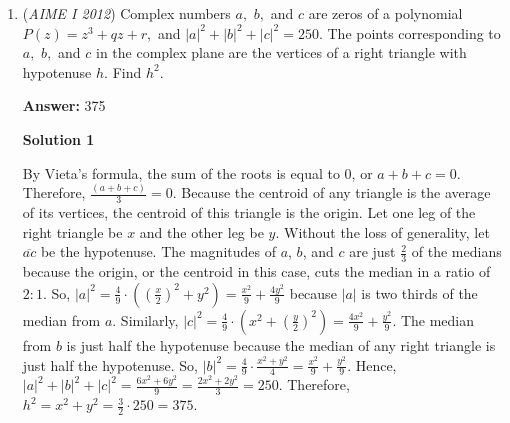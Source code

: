 \begin{enumerate}
 Summing, we have $[ADBECF] = 18 + \dfrac{25\sqrt{3}}{2}$

 Thus, $[ABC] = 9+\dfrac{25\sqrt{3}}{4}$, $9+25+3+4 = \boxed{41}$




\textbf{Solution 7 (faster than the fastest)}

Label the center of the circles $X$, and proceed with Solution 1 until out of the two possible equilateral triangles, you find the larger one.

 We note that the square of the side length $s$ of an equilateral triangle $ABC$ with the only information given being an arbitrary point $X$ inside $ABC$ such that $XA = a, XB = b, XB = c$ is given by the following formula:

 
 \[s^2 = \frac{1}{2}(a^2+b^2+c^2) + 2\sqrt{3}\delta,\]

 where $\delta$ equals the area of the triangle with side lengths $a,b,c.$ Since the $3,4,5$ triangle has area $6, \delta=6$ for us. Plugging in the other values $(XA = 5, XB = 4, XC = 3)$, we get

 
 \[s^2 = \frac{1}{2}(3^2+4^2+5^2) + 12\sqrt{3}.\]

 Multiplying this by $\frac{\sqrt{3}}{4},$ we attain the answer of 

 
 \[\frac{s^2\sqrt{3}}{4} = \frac{\sqrt{3}}{4}(25 + 12\sqrt{3}) = 9 + \frac{25\sqrt{3}}{4}, \Longrightarrow 9+25+3+4 = \boxed{041}.\]

 \href{https://artofproblemsolving.com/videos/amc/2012aimei/353}{https://artofproblemsolving.com/videos/amc/2012aimei/353}

 


	\item (\textit{AIME I 2012}) Complex numbers $a,$ $b,$ and $c$ are zeros of a polynomial $P(z) = z^3 + qz + r,$ and $|a|^2 + |b|^2 + |c|^2 = 250.$ The points corresponding to $a,$ $b,$ and $c$ in the complex plane are the vertices of a right triangle with hypotenuse $h.$ Find $h^2.$

 \textbf{Answer: }375



\textbf{Solution 1}

By Vieta's formula, the sum of the roots is equal to 0, or $a+b+c=0$. Therefore, $\frac{(a+b+c)}{3}=0$. Because the centroid of any triangle is the average of its vertices, the centroid of this triangle is the origin. Let one leg of the right triangle be $x$ and the other leg be $y$. Without the loss of generality, let $\overline{ac}$ be the hypotenuse. The magnitudes of $a$, $b$, and $c$ are just $\frac{2}{3}$ of the medians because the origin, or the centroid in this case, cuts the median in a ratio of $2:1$. So, $|a|^2=\frac{4}{9}\cdot((\frac{x}{2})^2+y^2)=\frac{x^2}{9}+\frac{4y^2}{9}$ because $|a|$ is two thirds of the median from $a$. Similarly, $|c|^2=\frac{4}{9}\cdot(x^2+(\frac{y}{2})^2)=\frac{4x^2}{9}+\frac{y^2}{9}$. The median from $b$ is just half the hypotenuse because the median of any right triangle is just half the hypotenuse. So, $|b|^2=\frac{4}{9}\cdot\frac{x^2+y^2}{4}=\frac{x^2}{9}+\frac{y^2}{9}$. Hence, $|a|^2+|b|^2+|c|^2=\frac{6x^2+6y^2}{9}=\frac{2x^2+2y^2}{3}=250$. Therefore, $h^2=x^2+y^2=\frac{3}{2}\cdot250=\boxed{375}$.


\end{enumerate}
